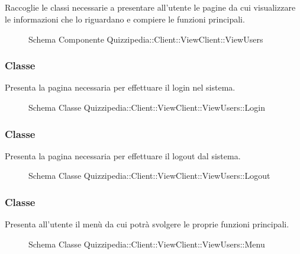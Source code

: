 \subsection{}
Raccoglie le classi necessarie a presentare all'utente le pagine da cui visualizzare le informazioni che lo riguardano e compiere le funzioni principali.
\begin{figure}[H]
\centering
\noindent{}
\caption[Schema Componente Quizzipedia::Client::ViewClient::ViewUsers]{Schema Componente Quizzipedia::Client::ViewClient::ViewUsers}
\end{figure}
\subsubsection{Classe }
Presenta la pagina necessaria per effettuare il login nel sistema.
\begin{figure}[H]
\centering
\noindent{}
\caption[Schema Classe Login]{Schema Classe Quizzipedia::Client::ViewClient::ViewUsers::Login}
\end{figure}
\subsubsection{Classe }
Presenta la pagina necessaria per effettuare il logout dal sistema.
\begin{figure}[H]
\centering
\noindent{}
\caption[Schema Classe Logout]{Schema Classe Quizzipedia::Client::ViewClient::ViewUsers::Logout}
\end{figure}
\subsubsection{Classe }
Presenta all'utente il menù da cui potrà svolgere le proprie funzioni principali.
\begin{figure}[H]
\centering
\noindent{}
\caption[Schema Classe Menu]{Schema Classe Quizzipedia::Client::ViewClient::ViewUsers::Menu}
\end{figure}
